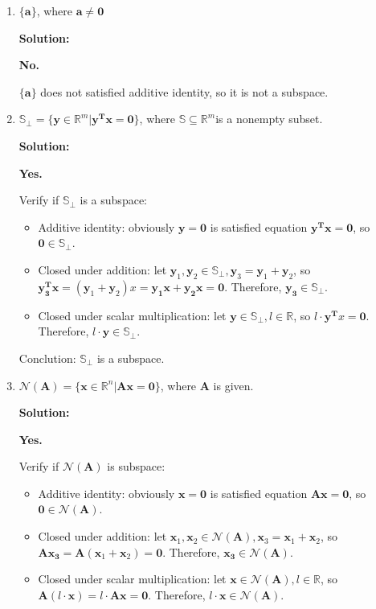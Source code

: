 \documentclass[12pt, letterpaper, onecolumn]{article}
\begin{document}
\begin{enumerate}[start=2]
{\begin{enumerate}
                Conclution: $\mathbb{X}\oplus\mathbb{Y}$ is a subspace.
				
				\item %
				$\{\bm{a}\}$, where $\bm{a}\neq\bm{0}$

				\textbf{Solution:}
                
                \textbf{No.}

                $\{\bm{a}\}$ does not satisfied additive identity, so it is not a subspace.

				\item %
				$\mathbb{S}_\perp=\{\bm{y}\in\mathbb{R}^m|\bm{y^Tx}=\bm{0}\}$, %
				where $\mathbb{S}\subseteq\mathbb{R}^m$is a nonempty subset.

				\textbf{Solution:}

                \textbf{Yes.}

                Verify if $\mathbb{S}_\perp$ is a subspace:

                \begin{itemize}
                    \item Additive identity: obviously $\bm{y} = \bm{0}$ is satisfied equation $\bm{y^Tx}=\bm{0}$, so $\bm{0} \in \mathbb{S}_\perp$.
                    \item Closed under addition: let $\bm{y}_1, \bm{y}_2 \in \mathbb{S}_\perp, \bm{y}_3 = \bm{y}_1 + \bm{y}_2$, so $\bm{y_3^Tx} = (\bm{y}_1 + \bm{y}_2)x = \bm{y_1x} + \bm{y_2x} = \bm{0}$. Therefore, $\bm{y_3} \in \mathbb{S}_\perp$.
                    \item Closed under scalar multiplication: let $\bm{y} \in \mathbb{S}_\perp, l \in \mathbb{R}$, so $l\cdot\bm{y^T}x = \bm{0}$. Therefore, $l\cdot\bm{y} \in \mathbb{S}_\perp$.
                \end{itemize}

                Conclution: $\mathbb{S}_\perp$ is a subspace.

				\item %
				$\mathcal{N}(\bm{A})=\{\bm{x}\in\mathbb{R}^n|\bm{Ax}=\bm{0}\}$, where $\bm{A}$ is given.

				\textbf{Solution:}

                \textbf{Yes.}

                Verify if $\mathcal{N}(\bm{A})$ is subspace:
                \begin{itemize}
                    \item Additive identity: obviously $\bm{x} = \bm{0}$ is satisfied equation $\bm{Ax}=\bm{0}$, so $\bm{0} \in \mathcal{N}(\bm{A})$.
                    \item Closed under addition: let $\bm{x}_1, \bm{x}_2 \in \mathcal{N}(\bm{A}), \bm{x}_3 = \bm{x}_1 + \bm{x}_2$, so $\bm{Ax_3} = \bm{A}(\bm{x}_1 + \bm{x}_2) = \bm{0}$. Therefore, $\bm{x_3} \in \mathcal{N}(\bm{A})$.
                    \item Closed under scalar multiplication: let $\bm{x} \in \mathcal{N}(\bm{A}), l \in \mathbb{R}$, so $\bm{A}(l\cdot\bm{x}) = l\cdot \bm{Ax} = \bm{0}$. Therefore, $l\cdot\bm{x} \in \mathcal{N}(\bm{A})$.
                \end{itemize}
				

\end{enumerate}}
\end{enumerate}
\end{document}
